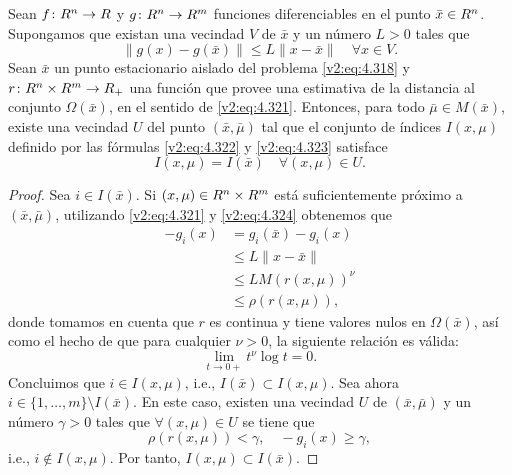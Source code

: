 \begin{proposition}\label{v2:prop:4.7.1}
    Sean $f \colon R^n \to R$ y $g \colon R^n \to R^m$ funciones diferenciables en el punto $\bar{x} \in R^n$. Supongamos que existan una vecindad $V$ de $\bar{x}$ y un número $L > 0$ tales que
    \begin{equation}
        \|g(x) - g(\bar{x})\| \le L\|x - \bar{x}\| \quad \forall x \in V.
        \label{v2:eq:4.324}
    \end{equation}
    Sean $\bar{x}$ un punto estacionario aislado del problema \eqref{v2:eq:4.318} y $r \colon R^n \times R^m \to R_+$ una función que provee una estimativa de la distancia al conjunto $\Omega(\bar{x})$, en el sentido de \eqref{v2:eq:4.321}.
    Entonces, para todo $\bar{\mu} \in M(\bar{x})$, existe una vecindad $U$ del punto $(\bar{x}, \bar{\mu})$ tal que el conjunto de índices $I(x, \mu)$ definido por las fórmulas \eqref{v2:eq:4.322} y \eqref{v2:eq:4.323} satisface
    \begin{equation}
        I(x, \mu) = I(\bar{x}) \quad \forall (x, \mu) \in U.
        \label{v2:eq:4.325}
    \end{equation}
\end{proposition}
\begin{proof}
    Sea $i \in I(\bar{x})$. Si $(x, \mu) \in R^n \times R^m$ está suficientemente próximo a $(\bar{x}, \bar{\mu})$, utilizando \eqref{v2:eq:4.321} y \eqref{v2:eq:4.324} obtenemos que
    \begin{align*}
        -g_i(x) &= g_i(\bar{x}) - g_i(x) \\
        &\le L\|x - \bar{x}\| \\
        &\le LM(r(x, \mu))^\nu \\
        &\le \rho(r(x, \mu)),
    \end{align*}
    donde tomamos en cuenta que $r$ es continua y tiene valores nulos en $\Omega(\bar{x})$, así como el hecho de que para cualquier $\nu > 0$, la siguiente relación es válida:
    \[
        \lim_{t \to 0+} t^\nu \log t = 0.
    \]
    Concluimos que $i \in I(x, \mu)$, i.e., $I(\bar{x}) \subset I(x, \mu)$.
    Sea ahora $i \in \{1, \dots, m\} \setminus I(\bar{x})$. En este caso, existen una vecindad $U$ de $(\bar{x}, \bar{\mu})$ y un número $\gamma > 0$ tales que $\forall (x, \mu) \in U$ se tiene que
    \[
        \rho(r(x, \mu)) < \gamma, \quad -g_i(x) \ge \gamma,
    \]
    i.e., $i \notin I(x, \mu)$. Por tanto, $I(x, \mu) \subset I(\bar{x})$.
\end{proof}

